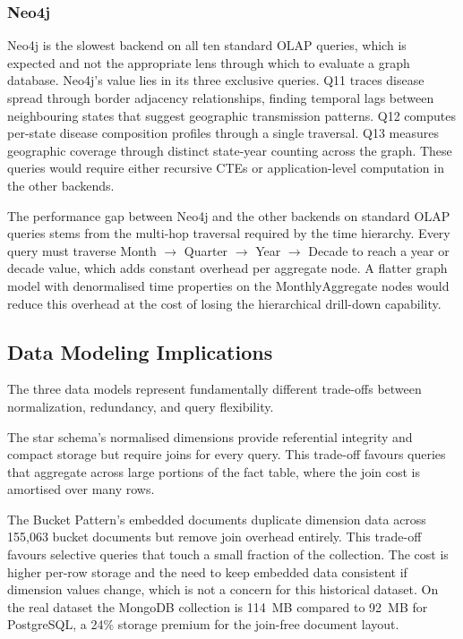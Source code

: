 \documentclass[12pt,a4paper]{article}
\begin{document}
\subsubsection{Neo4j}

Neo4j is the slowest backend on all ten standard OLAP queries, which is expected and not the appropriate lens through which to evaluate a graph database. Neo4j's value lies in its three exclusive queries. Q11 traces disease spread through border adjacency relationships, finding temporal lags between neighbouring states that suggest geographic transmission patterns. Q12 computes per-state disease composition profiles through a single traversal. Q13 measures geographic coverage through distinct state-year counting across the graph. These queries would require either recursive CTEs or application-level computation in the other backends.

The performance gap between Neo4j and the other backends on standard OLAP queries stems from the multi-hop traversal required by the time hierarchy. Every query must traverse Month $\rightarrow$ Quarter $\rightarrow$ Year $\rightarrow$ Decade to reach a year or decade value, which adds constant overhead per aggregate node. A flatter graph model with denormalised time properties on the MonthlyAggregate nodes would reduce this overhead at the cost of losing the hierarchical drill-down capability.

\subsection{Data Modeling Implications}

The three data models represent fundamentally different trade-offs between normalization, redundancy, and query flexibility.

The star schema's normalised dimensions provide referential integrity and compact storage but require joins for every query. This trade-off favours queries that aggregate across large portions of the fact table, where the join cost is amortised over many rows.

The Bucket Pattern's embedded documents duplicate dimension data across 155{,}063 bucket documents but remove join overhead entirely. This trade-off favours selective queries that touch a small fraction of the collection. The cost is higher per-row storage and the need to keep embedded data consistent if dimension values change, which is not a concern for this historical dataset. On the real dataset the MongoDB collection is 114~MB compared to 92~MB for PostgreSQL, a 24\% storage premium for the join-free document layout.
\end{document}
